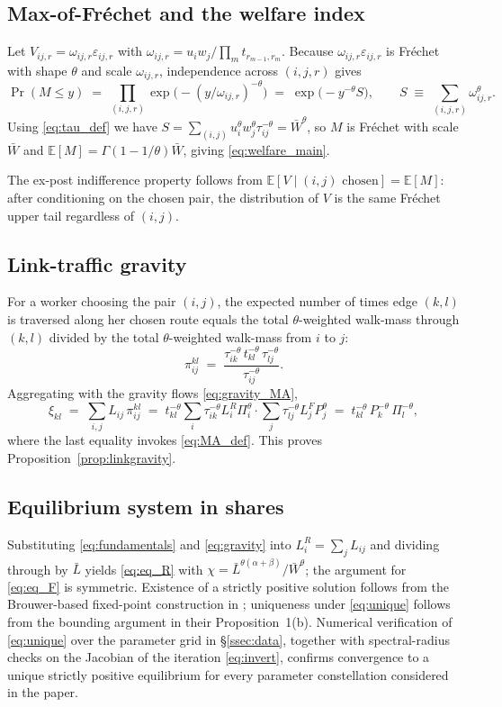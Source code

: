\documentclass[12pt]{article}
\newcommand{\Lbar}{\bar L}
\newcommand{\Wbar}{\bar W}
\newcommand{\tkl}{t_{kl}}
\newcommand{\tijk}{\tau_{ij}}
\begin{document}
\subsection{Max-of-Fr\'echet and the welfare index}\label{app:welfare}

Let $V_{ij,r}=\omega_{ij,r}\varepsilon_{ij,r}$ with
$\omega_{ij,r}=u_iw_j/\prod_m t_{r_{m-1},r_m}$.  Because
$\omega_{ij,r}\varepsilon_{ij,r}$ is Fr\'echet with shape $\theta$ and
scale $\omega_{ij,r}$, independence across $(i,j,r)$ gives
\[
  \Pr(M\le y)
  \;=\;\prod_{(i,j,r)}\exp\!\bigl(-(y/\omega_{ij,r})^{-\theta}\bigr)
  \;=\;\exp\!\bigl(-y^{-\theta}S\bigr),
  \qquad
  S\;\equiv\;\sum_{(i,j,r)}\omega_{ij,r}^{\theta}.
\]
Using \eqref{eq:tau_def} we have $S=\sum_{(i,j)}u_i^{\theta}w_j^{\theta}\tijk^{-\theta}
=\Wbar^{\theta}$, so $M$ is Fr\'echet with scale $\Wbar$ and
$\mathbb E[M]=\Gamma(1-1/\theta)\Wbar$, giving
\eqref{eq:welfare_main}.

The ex-post indifference property follows from $\mathbb E[V\mid(i,j)
\text{ chosen}]=\mathbb E[M]$: after conditioning on the chosen pair,
the distribution of $V$ is the same Fr\'echet upper tail regardless of
$(i,j)$.

\subsection{Link-traffic gravity}\label{app:linkgravity}

For a worker choosing the pair $(i,j)$, the expected number of times
edge $(k,l)$ is traversed along her chosen route equals the total
$\theta$-weighted walk-mass through $(k,l)$ divided by the total
$\theta$-weighted walk-mass from $i$ to $j$:
\[
  \pi^{kl}_{ij}
  \;=\;
  \frac{\tau_{ik}^{-\theta}\,\tkl^{-\theta}\,\tau_{lj}^{-\theta}}
       {\tijk^{-\theta}}.
\]
Aggregating with the gravity flows \eqref{eq:gravity_MA},
\[
  \xi_{kl}
  \;=\;\sum_{i,j}L_{ij}\,\pi^{kl}_{ij}
  \;=\;\tkl^{-\theta}\sum_{i}\tau_{ik}^{-\theta}L_i^R\Pi_i^{\theta}\cdot
                     \sum_{j}\tau_{lj}^{-\theta}L_j^FP_j^{\theta}
  \;=\;\tkl^{-\theta}\,P_k^{-\theta}\,\Pi_l^{-\theta},
\]
where the last equality invokes \eqref{eq:MA_def}.  This proves
Proposition~\ref{prop:linkgravity}.

\subsection{Equilibrium system in shares}\label{app:eqshares}

Substituting \eqref{eq:fundamentals} and \eqref{eq:gravity} into
$L_i^R=\sum_jL_{ij}$ and dividing through by $\Lbar$ yields
\eqref{eq:eq_R} with
$\chi=\Lbar^{\theta(\alpha+\beta)}/\Wbar^{\theta}$; the argument for
\eqref{eq:eq_F} is symmetric.  Existence of a strictly positive
solution follows from the Brouwer-based fixed-point construction in
\citet{AllenArkolakis2022}; uniqueness under \eqref{eq:unique}
follows from the bounding argument in their Proposition~1(b).
Numerical verification of \eqref{eq:unique} over the parameter grid
in \S\ref{ssec:data}, together with spectral-radius checks on the
Jacobian of the iteration \eqref{eq:invert}, confirms convergence to
a unique strictly positive equilibrium for every parameter
constellation considered in the paper.
\end{document}
